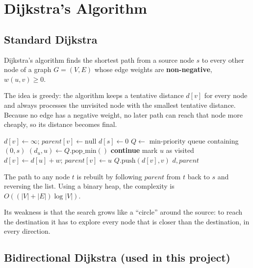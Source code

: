 \documentclass[11pt,letterpaper]{article}
\begin{document}
\section{Dijkstra's Algorithm}

\subsection{Standard Dijkstra}

Dijkstra's algorithm finds the shortest path from a source node $s$ to every
other node of a graph $G=(V,E)$ whose edge weights are \textbf{non-negative},
$w(u,v)\ge 0$.

The idea is greedy: the algorithm keeps a tentative distance $d[v]$ for every
node and always processes the unvisited node with the smallest tentative
distance. Because no edge has a negative weight, no later path can reach that
node more cheaply, so its distance becomes final.

\begin{algorithm}[H]
\caption{Standard Dijkstra}
\begin{algorithmic}[1]
    \State $d[v] \gets \infty$; \quad $parent[v] \gets \text{null}$
  \EndFor
  \State $d[s] \gets 0$
  \State $Q \gets$ min-priority queue containing $(0, s)$
    \State $(d_u, u) \gets Q.\text{pop\_min}()$
     \textbf{continue} \EndIf
    \State mark $u$ as visited
       
        \State $d[v] \gets d[u] + w$; \quad $parent[v] \gets u$
        \State $Q.\text{push}(d[v], v)$
      \EndIf
    \EndFor
  \EndWhile
  \State \Return $d, parent$
\EndProcedure
\end{algorithmic}
\end{algorithm}

The path to any node $t$ is rebuilt by following $parent$ from $t$ back to
$s$ and reversing the list. Using a binary heap, the complexity is
$O((|V|+|E|)\log|V|)$.

Its weakness is that the search grows like a ``circle'' around the source: to
reach the destination it has to explore every node that is closer than the
destination, in every direction.

\subsection{Bidirectional Dijkstra (used in this project)}
\end{document}
